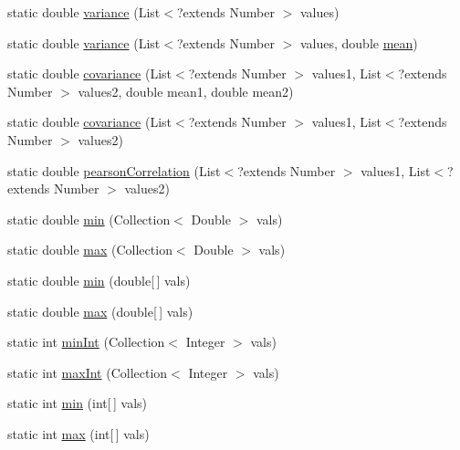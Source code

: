 \begin{DoxyCompactItemize}
\item 
static double \hyperlink{classbroad_1_1core_1_1math_1_1_statistics_abf26a1820e793c65aff0a00dd6ad798d}{variance} (List$<$?extends Number $>$ values)
\item 
static double \hyperlink{classbroad_1_1core_1_1math_1_1_statistics_a99a714feafae1762cd5383fa661b02f5}{variance} (List$<$?extends Number $>$ values, double \hyperlink{classbroad_1_1core_1_1math_1_1_statistics_a6cee05563e8d7390baaf1248fddc8596}{mean})
\item 
static double \hyperlink{classbroad_1_1core_1_1math_1_1_statistics_adccf05d41f39445ef05d90e1b0d52b0e}{covariance} (List$<$?extends Number $>$ values1, List$<$?extends Number $>$ values2, double mean1, double mean2)
\item 
static double \hyperlink{classbroad_1_1core_1_1math_1_1_statistics_aedf6995b63dccca6864f7ad907914fbe}{covariance} (List$<$?extends Number $>$ values1, List$<$?extends Number $>$ values2)
\item 
static double \hyperlink{classbroad_1_1core_1_1math_1_1_statistics_a568c45dbca1f332a22e7a7e6de5190be}{pearson\+Correlation} (List$<$?extends Number $>$ values1, List$<$?extends Number $>$ values2)
\item 
static double \hyperlink{classbroad_1_1core_1_1math_1_1_statistics_a2cbf81e1a3eb5c9bfd30319aee206dae}{min} (Collection$<$ Double $>$ vals)
\item 
static double \hyperlink{classbroad_1_1core_1_1math_1_1_statistics_aae496ccaf7ea2ba3a1a789f82fc8c830}{max} (Collection$<$ Double $>$ vals)
\item 
static double \hyperlink{classbroad_1_1core_1_1math_1_1_statistics_aeb09842c802c009c825df1a0d9395d18}{min} (double\mbox{[}$\,$\mbox{]} vals)
\item 
static double \hyperlink{classbroad_1_1core_1_1math_1_1_statistics_a395e7753ccacf0cb3f885b1e0c0d5341}{max} (double\mbox{[}$\,$\mbox{]} vals)
\item 
static int \hyperlink{classbroad_1_1core_1_1math_1_1_statistics_a725a0ee05b58170f99a60a987a0ee857}{min\+Int} (Collection$<$ Integer $>$ vals)
\item 
static int \hyperlink{classbroad_1_1core_1_1math_1_1_statistics_a88857f611a22b3dc9fae555ae6223091}{max\+Int} (Collection$<$ Integer $>$ vals)
\item 
static int \hyperlink{classbroad_1_1core_1_1math_1_1_statistics_ab66ef78bafa36c1c25710aed67bd7efe}{min} (int\mbox{[}$\,$\mbox{]} vals)
\item 
static int \hyperlink{classbroad_1_1core_1_1math_1_1_statistics_a2a8a95adcfab09b29fddd40de4314ade}{max} (int\mbox{[}$\,$\mbox{]} vals)

\end{DoxyCompactItemize}
